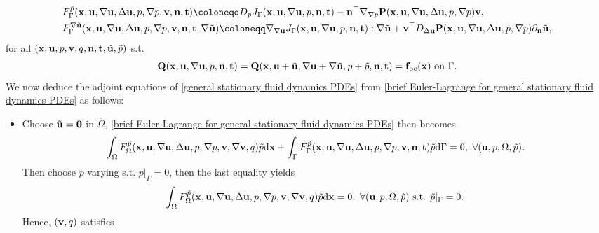 \documentclass[oneside,11pt]{book}
\numberwithin{equation}{section}
\begin{document}
\begin{itemize}[leftmargin=0in]
\begin{align*}
        &F_\Gamma^{\tilde{p}}({\bf x},{\bf u},\nabla{\bf u},\Delta{\bf u},p,\nabla p,{\bf v},{\bf n},{\bf t})\coloneqq D_pJ_\Gamma({\bf x},{\bf u},\nabla{\bf u},p,{\bf n},{\bf t}) - {\bf n}^\top\nabla_{\nabla p}{\bf P}({\bf x},{\bf u},\nabla{\bf u},\Delta{\bf u},p,\nabla p){\bf v},\\
        &F_\Gamma^{\nabla\tilde{\bf u}}({\bf x},{\bf u},\nabla{\bf u},\Delta{\bf u},p,\nabla p,{\bf v},{\bf n},{\bf t},\nabla\tilde{\bf u})\coloneqq\nabla_{\nabla{\bf u}}J_\Gamma({\bf x},{\bf u},\nabla{\bf u},p,{\bf n},{\bf t}):\nabla\tilde{\bf u} + {\bf v}^\top D_{\Delta{\bf u}}{\bf P}({\bf x},{\bf u},\nabla{\bf u},\Delta{\bf u},p,\nabla p)\partial_{\bf n}\tilde{\bf u},
    \end{align*}
    for all $({\bf x},{\bf u},p,{\bf v},q,{\bf n},{\bf t},\tilde{\bf u},\tilde{p})$ s.t.
    \begin{align*}
        {\bf Q}({\bf x},{\bf u},\nabla{\bf u},p,{\bf n},{\bf t}) = {\bf Q}({\bf x},{\bf u} + \tilde{\bf u},\nabla{\bf u} + \nabla\tilde{\bf u},p + \tilde{p},{\bf n},{\bf t}) = {\bf f}_{\rm bc}({\bf x}) \mbox{ on } \Gamma.
    \end{align*}    
    We now deduce the adjoint equations of \eqref{general stationary fluid dynamics PDEs} from \eqref{brief Euler-Lagrange for general stationary fluid dynamics PDEs} as follows:
    \begin{itemize}
        \item Choose $\tilde{\bf u} = {\bf 0}$ in $\overline{\Omega}$, \eqref{brief Euler-Lagrange for general stationary fluid dynamics PDEs} then becomes
        \begin{align*}
            \int_\Omega F_\Omega^{\tilde{p}}({\bf x},{\bf u},\nabla{\bf u},\Delta{\bf u},p,\nabla p,{\bf v},\nabla{\bf v},q)\tilde{p}{\rm d}{\bf x} + \int_\Gamma F_\Gamma^{\tilde{p}}({\bf x},{\bf u},\nabla{\bf u},\Delta{\bf u},p,\nabla p,{\bf v},{\bf n},{\bf t})\tilde{p}{\rm d}\Gamma = 0,\ \forall({\bf u},p,\Omega,\tilde{p}).
        \end{align*}
        Then choose $\tilde{p}$ varying s.t. $\tilde{p}|_\Gamma = 0$, then the last equality yields
        \begin{align*}
            \int_\Omega F_\Omega^{\tilde{p}}({\bf x},{\bf u},\nabla{\bf u},\Delta{\bf u},p,\nabla p,{\bf v},\nabla{\bf v},q)\tilde{p}{\rm d}{\bf x} = 0,\ \forall({\bf u},p,\Omega,\tilde{p}) \mbox{ s.t. } \tilde{p}|_\Gamma = 0.
        \end{align*}
        Hence, $({\bf v},q)$ satisfies
        \begin{align}

\end{align}
\end{itemize}
\end{itemize}
\end{document}
